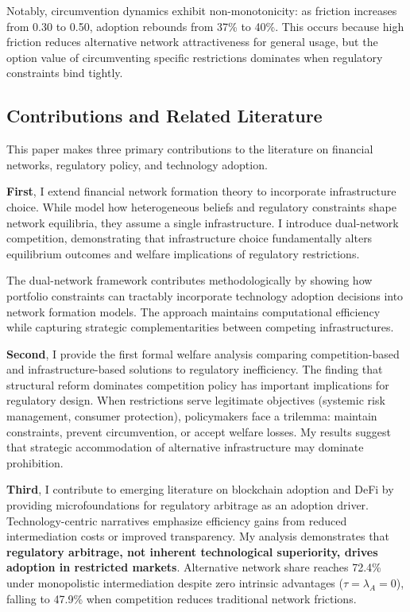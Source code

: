 \documentclass[12pt]{article}
\begin{document}
Notably, circumvention dynamics exhibit non-monotonicity: as friction increases from 0.30 to 0.50, adoption rebounds from 37\% to 40\%. This occurs because high friction reduces alternative network attractiveness for general usage, but the option value of circumventing specific restrictions dominates when regulatory constraints bind tightly.


\subsection{Contributions and Related Literature}

This paper makes three primary contributions to the literature on financial networks, regulatory policy, and technology adoption.

\textbf{First}, I extend financial network formation theory to incorporate infrastructure choice. While \citet{jalan_incentive-aware_2024} model how heterogeneous beliefs and regulatory constraints shape network equilibria, they assume a single infrastructure. I introduce dual-network competition, demonstrating that infrastructure choice fundamentally alters equilibrium outcomes and welfare implications of regulatory restrictions.

The dual-network framework contributes methodologically by showing how portfolio constraints can tractably incorporate technology adoption decisions into network formation models. The approach maintains computational efficiency while capturing strategic complementarities between competing infrastructures.

\textbf{Second}, I provide the first formal welfare analysis comparing competition-based and infrastructure-based solutions to regulatory inefficiency. The finding that structural reform dominates competition policy has important implications for regulatory design. When restrictions serve legitimate objectives (systemic risk management, consumer protection), policymakers face a trilemma: maintain constraints, prevent circumvention, or accept welfare losses. My results suggest that strategic accommodation of alternative infrastructure may dominate prohibition.

\textbf{Third}, I contribute to emerging literature on blockchain adoption and DeFi by providing microfoundations for regulatory arbitrage as an adoption driver. Technology-centric narratives emphasize efficiency gains from reduced intermediation costs or improved transparency. My analysis demonstrates that \textbf{regulatory arbitrage, not inherent technological superiority, drives adoption in restricted markets}. Alternative network share reaches 72.4\% under monopolistic intermediation despite zero intrinsic advantages ($\tau = \lambda_A = 0$), falling to 47.9\% when competition reduces traditional network frictions.
\end{document}
